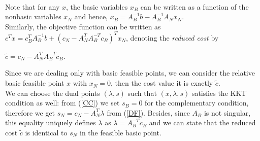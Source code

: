 \documentclass[a4paper,10 pt,titlepage,twoside]{book}
\theoremstyle{plain}
\theoremstyle{definition}
\theoremstyle{remark}
\begin{document}
 \\Note that for any $x$, the basic variables $x_{B}$ can be written as a function of the nonbasic variables $x_{N}$ and hence, $x_{B}=A_{B}^{-1}b-A_{B}^{-1}A_{N}x_{N}$. \\Similarly, the objective function can be written as $c^{T}x=c_{B}^{T}A_{B}^{-1}b+(c_{N}-A_{N}^{T}A_{B}^{-T}c_{B})^{T}x_{N}$, denoting the \textit{reduced cost} by \begin{center}
 	$\widetilde{c}=c_{N}-A_{N}^{T}A_{B}^{-T}c_{B}$.
 \end{center}Since we are dealing only with basic feasible points, we can consider the relative basic feasible point $x$ with $x_{N}= 0$, then the cost value it is exactly $\widetilde{c}$.\\
 We can choose the dual points $(\lambda,s)$ such that $(x, \lambda, s)$ satisfies the KKT condition as well: from (\ref{CC}) we set $s_{B}= 0$ for the complementary condition, therefore we get $s_{N}= c_{N}- A_{N}^{T}\lambda$ from (\ref{DF}). Besides, since $A_{B}$ is not singular, this equality uniquely defines $\lambda$ as $\lambda = A_{B}^{-T}c_{B}$ and we can state that the reduced cost $\tilde{c}$ is identical to $s_{N}$ in the feasible basic point.\\  
 
\end{document}
